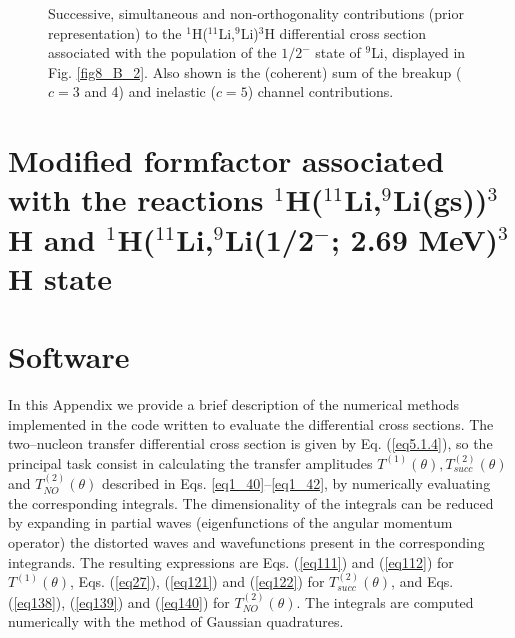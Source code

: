 \begin{subappendices}
\begin{figure}
        	\caption{Successive, simultaneous and non-orthogonality contributions (prior representation)
        	to the  $^1$H($^{11}$Li,$^9$Li)$^3$H differential cross section
        	associated with the population of the $1/2^-$ state
        	of $^9$Li, displayed in Fig. \ref{fig8_B_2}. Also shown is the (coherent) sum of the breakup ($c=3$ and 4) and inelastic ($c=5$) channel contributions.}\label{fig8_B_3}
        \end{figure}
\section[Formfactors for the reaction $^1$H($^{11}$Li,$^9$Li)$^3$H]{Modified formfactor associated with the reactions $^1$H($^{11}$Li,$^9$Li(gs))$^3$H and $^1$H($^{11}$Li,$^9$Li(1/2$^-$; 2.69 MeV)$^3$H state}\label{C8AppC}
\section{Software}\label{C8AppD}
In this Appendix we provide a brief description of the numerical methods implemented in the code written to evaluate the differential cross sections. The two--nucleon transfer differential cross section is given by Eq. (\ref{eq5.1.4}),  so the principal task consist in calculating the transfer amplitudes $T^{(1)}(\theta),T^{(2)}_{succ}(\theta)$ and $T^{(2)}_{NO}(\theta)$ described in Eqs. \ref{eq1_40}--\ref{eq1_42}, by numerically evaluating the corresponding integrals.  The dimensionality of the integrals  can be reduced by expanding in partial waves (eigenfunctions of the angular momentum operator) the distorted waves and wavefunctions present in the corresponding integrands. The resulting expressions are Eqs. (\ref{eq111}) and (\ref{eq112}) for $T^{(1)}(\theta)$, Eqs. (\ref{eq27}), (\ref{eq121}) and (\ref{eq122}) for $T^{(2)}_{succ}(\theta)$, and Eqs. (\ref{eq138}), (\ref{eq139}) and (\ref{eq140}) for $T^{(2)}_{NO}(\theta)$. The integrals are computed numerically with the method of Gaussian quadratures. 



\end{subappendices}
